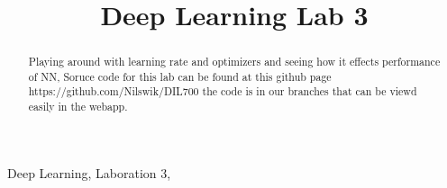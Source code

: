 \documentclass[conference, twocolum]{IEEEtran}
\begin{document}
\title{Deep Learning Lab 3 \\
}

\author{
\and
{}
\and
{}
}

\maketitle

\thispagestyle{plain}
\pagestyle{plain}


\begin{IEEEkeywords}
Deep Learning, Laboration 3,
\end{IEEEkeywords}
\begin{abstract} Playing around with learning rate and optimizers and seeing how it effects performance of NN, Soruce code for this lab can be found at this github page https://github.com/Nilswik/DIL700 the code is in our branches that can be viewd easily in the webapp.
\end{abstract}
\end{document}
